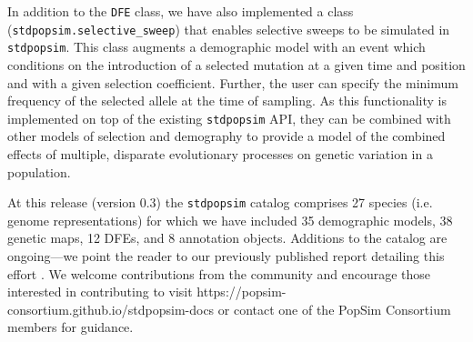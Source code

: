 \documentclass[hidelinks]{article}
\newcommand{\stdpopsim}{\texttt{stdpopsim}\xspace}
\begin{document}
    In addition to the \texttt{DFE} class, we have also implemented a class (\texttt{stdpopsim.selective\_sweep})
    that enables selective sweeps to be simulated in \stdpopsim.
    This class augments a demographic model with an event
    which conditions on the introduction of a selected mutation at a given time and position
    and with a given selection coefficient. Further, the user can specify the minimum frequency
    of the selected allele at the time of sampling. As this functionality is implemented
    on top of the existing \stdpopsim API, they can be combined with other models of selection
    and demography to provide a model of the combined effects of multiple, disparate evolutionary processes
    on genetic variation in a population.
    

    At this release (version 0.3) the \stdpopsim catalog comprises 27 species (i.e. genome representations)
    for which we have included 35 demographic models, 38 genetic maps, 12 DFEs, and 8 annotation objects. %
    Additions to the catalog are ongoing---we point the reader to our previously published 
    report detailing this effort \citep{lauterbur2023expanding}. We welcome contributions from the
    community and encourage those interested in contributing to visit https://popsim-consortium.github.io/stdpopsim-docs
    or contact one of the PopSim Consortium members for guidance.


\end{document}
